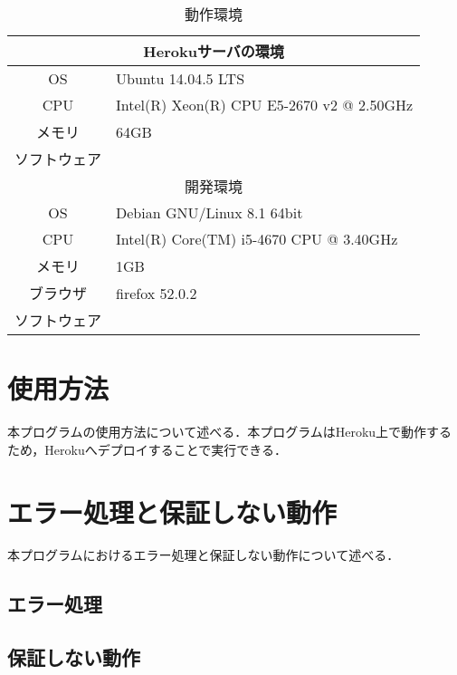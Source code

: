 \documentclass[fleqn, 14pt]{extarticlej}
\begin{document}
\begin{table}[t]
  \begin{center}
    \caption{動作環境}
    \label{tab:env}
    \begin{tabular}{|c|l|} \hline
      \multicolumn{2}{|c|}{Herokuサーバの環境}\\ \hline \hline
      OS & Ubuntu 14.04.5 LTS\\ 
      CPU & Intel(R) Xeon(R) CPU E5-2670 v2 @ 2.50GHz\\ 
      メモリ & 64GB\\
      ソフトウェア & \\ \hline
      \multicolumn{2}{|c|}{開発環境}\\ \hline \hline
      OS & Debian GNU/Linux 8.1 64bit\\ 
      CPU & Intel(R) Core(TM) i5-4670 CPU @ 3.40GHz\\ 
      メモリ & 1GB\\ 
      ブラウザ & firefox 52.0.2\\ 
      ソフトウェア & \\ \hline
    \end{tabular}
  \end{center}
\end{table}

\section{使用方法}
本プログラムの使用方法について述べる．本プログラムはHeroku上で動作するため，Herokuへデプロイすることで実行できる．

\section{エラー処理と保証しない動作}
本プログラムにおけるエラー処理と保証しない動作について述べる．

\subsection{エラー処理}

\subsection{保証しない動作}
\end{document}
